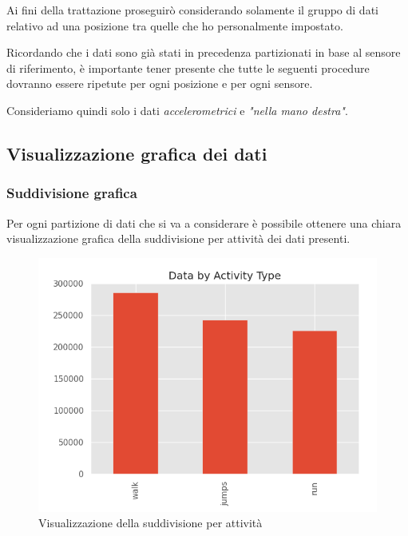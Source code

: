 \vspace{5mm} %

Ai fini della trattazione proseguirò considerando solamente il gruppo di dati relativo ad una posizione 
tra quelle che ho personalmente impostato.

Ricordando che i dati sono già stati in precedenza partizionati in base al sensore di riferimento, è importante tener presente 
che tutte le seguenti procedure dovranno essere ripetute per ogni posizione e per ogni sensore.

\vspace{5mm} %

Consideriamo quindi solo i dati \textit{accelerometrici} e \textit{"nella mano destra"}.


\subsection{Visualizzazione grafica dei dati}
\subsubsection{Suddivisione grafica}
Per ogni partizione di dati che si va a considerare è possibile ottenere una chiara visualizzazione grafica 
della suddivisione per attività dei dati presenti.
\begin{figure}[H]
    \centering
    \includegraphics[scale = 0.60]{assets/images/classifications/accelerometer/right_hand/activity-type-graph-right-hand-acc.png}
    \caption{Visualizzazione della suddivisione per attività}
\end{figure}


